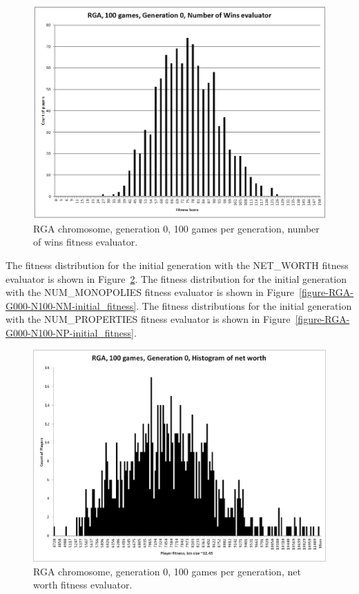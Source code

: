 \begin{figure}[htbp]
\centerline{\includegraphics[width=0.75\columnwidth]{Figures/RGA_1024_G000_N100_NW.png}}
\caption[RGA Fitness Distribution, Initial Generation]{RGA chromosome,
generation 0, 100 games per generation, number of wins fitness evaluator.}
\label{figure-RGA-G000-N100-NW-initial_fitness}
\end{figure}

The fitness distribution for the initial generation with the NET\_WORTH fitness
evaluator is shown in Figure~\ref{figure-RGA-G000-N100-NetW-initial_fitness}.
The fitness distribution for the initial generation with the NUM\_MONOPOLIES
fitness evaluator is shown in
Figure~\ref{figure-RGA-G000-N100-NM-initial_fitness}.
The fitness distributions for the initial generation with the NUM\_PROPERTIES
fitness evaluator is shown in
Figure~\ref{figure-RGA-G000-N100-NP-initial_fitness}. 

\begin{figure}[htbp]
\centerline{\includegraphics[width=0.75\columnwidth]{Figures/RGA_1024_G000_N100_NetW.png}}
\caption[RGA Fitness Distribution, Initial Generation]{RGA chromosome,
generation 0, 100 games per generation, net worth fitness evaluator.}
\label{figure-RGA-G000-N100-NetW-initial_fitness}
\end{figure}

